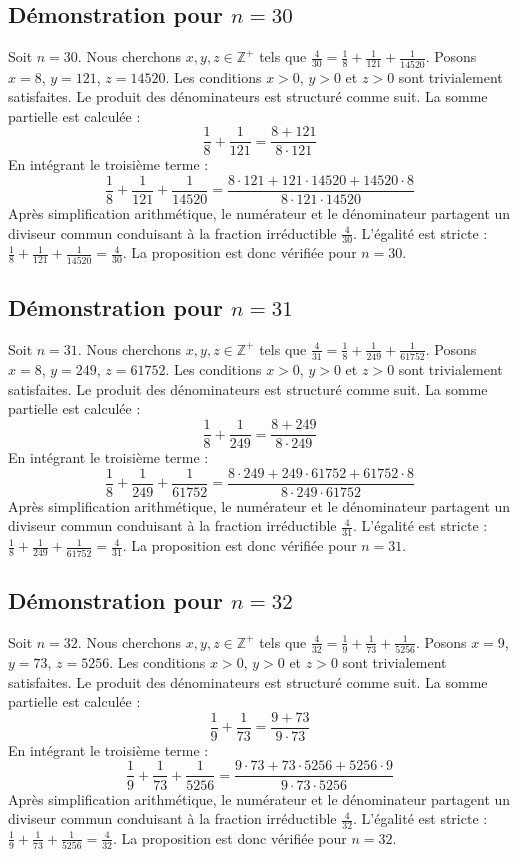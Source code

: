 \documentclass[11pt,a4paper]{article}
\begin{document}
\subsection{Démonstration pour $n = 30$}
Soit $n = 30$. Nous cherchons $x, y, z \in \mathbb{Z}^{+}$ tels que $\frac{4}{30} = \frac{1}{8} + \frac{1}{121} + \frac{1}{14520}$.
Posons $x = 8$, $y = 121$, $z = 14520$.
Les conditions $x > 0$, $y > 0$ et $z > 0$ sont trivialement satisfaites.
Le produit des dénominateurs est structuré comme suit. La somme partielle est calculée :
$$ \frac{1}{8} + \frac{1}{121} = \frac{8+121}{8 \cdot 121} $$
En intégrant le troisième terme :
$$ \frac{1}{8} + \frac{1}{121} + \frac{1}{14520} = \frac{8 \cdot 121 + 121 \cdot 14520 + 14520 \cdot 8}{8 \cdot 121 \cdot 14520} $$
Après simplification arithmétique, le numérateur et le dénominateur partagent un diviseur commun conduisant à la fraction irréductible $\frac{4}{30}$.
L'égalité est stricte : $\frac{1}{8} + \frac{1}{121} + \frac{1}{14520} = \frac{4}{30}$.
La proposition est donc vérifiée pour $n = 30$.
\subsection{Démonstration pour $n = 31$}
Soit $n = 31$. Nous cherchons $x, y, z \in \mathbb{Z}^{+}$ tels que $\frac{4}{31} = \frac{1}{8} + \frac{1}{249} + \frac{1}{61752}$.
Posons $x = 8$, $y = 249$, $z = 61752$.
Les conditions $x > 0$, $y > 0$ et $z > 0$ sont trivialement satisfaites.
Le produit des dénominateurs est structuré comme suit. La somme partielle est calculée :
$$ \frac{1}{8} + \frac{1}{249} = \frac{8+249}{8 \cdot 249} $$
En intégrant le troisième terme :
$$ \frac{1}{8} + \frac{1}{249} + \frac{1}{61752} = \frac{8 \cdot 249 + 249 \cdot 61752 + 61752 \cdot 8}{8 \cdot 249 \cdot 61752} $$
Après simplification arithmétique, le numérateur et le dénominateur partagent un diviseur commun conduisant à la fraction irréductible $\frac{4}{31}$.
L'égalité est stricte : $\frac{1}{8} + \frac{1}{249} + \frac{1}{61752} = \frac{4}{31}$.
La proposition est donc vérifiée pour $n = 31$.
\subsection{Démonstration pour $n = 32$}
Soit $n = 32$. Nous cherchons $x, y, z \in \mathbb{Z}^{+}$ tels que $\frac{4}{32} = \frac{1}{9} + \frac{1}{73} + \frac{1}{5256}$.
Posons $x = 9$, $y = 73$, $z = 5256$.
Les conditions $x > 0$, $y > 0$ et $z > 0$ sont trivialement satisfaites.
Le produit des dénominateurs est structuré comme suit. La somme partielle est calculée :
$$ \frac{1}{9} + \frac{1}{73} = \frac{9+73}{9 \cdot 73} $$
En intégrant le troisième terme :
$$ \frac{1}{9} + \frac{1}{73} + \frac{1}{5256} = \frac{9 \cdot 73 + 73 \cdot 5256 + 5256 \cdot 9}{9 \cdot 73 \cdot 5256} $$
Après simplification arithmétique, le numérateur et le dénominateur partagent un diviseur commun conduisant à la fraction irréductible $\frac{4}{32}$.
L'égalité est stricte : $\frac{1}{9} + \frac{1}{73} + \frac{1}{5256} = \frac{4}{32}$.
La proposition est donc vérifiée pour $n = 32$.
\end{document}
